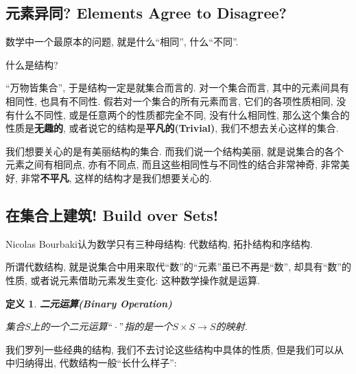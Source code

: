 \documentclass[UTF8]{ctexart}
\newcommand{\<}{\langle}
\renewcommand{\>}{\rangle}
\newtheorem{dfn}[thm]{定义}
\begin{document}
        \subsection{元素异同? Elements Agree to Disagree? }

            数学中一个最原本的问题, 就是什么``相同'', 什么``不同''. 
            
            什么是结构? 

            ``万物皆集合'', 于是结构一定是就集合而言的. 对一个集合而言, 其中的元素间具有相同性, 也具有不同性. 假若对一个集合的所有元素而言, 它们的各项性质相同, 没有什么不同性, 或是任意两个的性质都完全不同, 没有什么相同性, 那么这个集合的性质是\textbf{无趣的}, 或者说它的结构是\textbf{平凡的(Trivial)}, 我们不想去关心这样的集合. 

            我们想要关心的是有美丽结构的集合. 而我们说一个结构美丽, 就是说集合的各个元素之间有相同点, 亦有不同点, 而且这些相同性与不同性的结合非常神奇, 非常美好, 非常\textbf{不平凡}, 这样的结构才是我们想要关心的. 

        \subsection{在集合上建筑! Build over Sets! }

            Nicolas Bourbaki认为数学只有三种母结构: 代数结构, 拓扑结构和序结构. 

            所谓代数结构, 就是说集合中用来取代``数''的``元素''虽已不再是``数'', 却具有``数''的性质, 或者说元素借助元素发生变化: 这种数学操作就是运算. 

            \begin{dfn}
                \textbf{二元运算(Binary Operation)}

                集合$S$上的一个二元运算$``\cdot"$指的是一个$S\times S\to S$的映射. 
            \end{dfn}
            
            我们罗列一些经典的结构, 我们不去讨论这些结构中具体的性质, 但是我们可以从中归纳得出, 代数结构一般``长什么样子'': 
\end{document}
